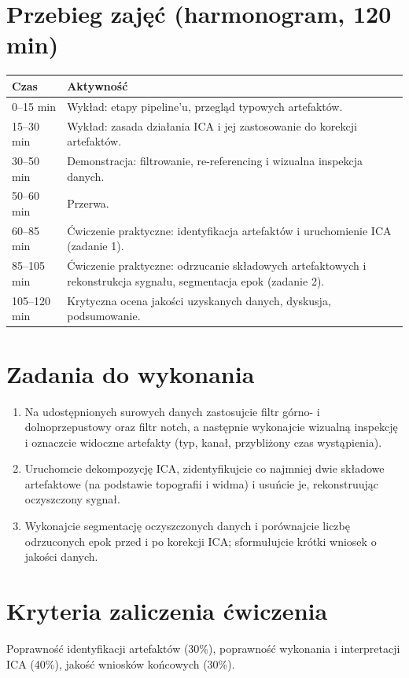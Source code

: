 \documentclass[11pt,a4paper]{article}
\begin{document}
\section{Przebieg zajęć (harmonogram, 120 min)}
\begin{center}
\begin{tabular}{@{}p{2.3cm}p{11.7cm}@{}}
\toprule
\textbf{Czas} & \textbf{Aktywność}\\
\midrule
0--15 min & Wykład: etapy pipeline'u, przegląd typowych artefaktów.\\
15--30 min & Wykład: zasada działania ICA i jej zastosowanie do korekcji artefaktów.\\
30--50 min & Demonstracja: filtrowanie, re-referencing i wizualna inspekcja danych.\\
50--60 min & Przerwa.\\
60--85 min & Ćwiczenie praktyczne: identyfikacja artefaktów i uruchomienie ICA (zadanie 1).\\
85--105 min & Ćwiczenie praktyczne: odrzucanie składowych artefaktowych i rekonstrukcja sygnału, segmentacja epok (zadanie 2).\\
105--120 min & Krytyczna ocena jakości uzyskanych danych, dyskusja, podsumowanie.\\
\bottomrule
\end{tabular}
\end{center}

\section{Zadania do wykonania}
\begin{enumerate}[label=\textbf{Zadanie \arabic*.}, leftmargin=2.7cm]
  \item Na udostępnionych surowych danych zastosujcie filtr górno- i dolnoprzepustowy oraz filtr notch, a następnie wykonajcie wizualną inspekcję i oznaczcie widoczne artefakty (typ, kanał, przybliżony czas wystąpienia).
  \item Uruchomcie dekompozycję ICA, zidentyfikujcie co najmniej dwie składowe artefaktowe (na podstawie topografii i widma) i usuńcie je, rekonstruując oczyszczony sygnał.
  \item Wykonajcie segmentację oczyszczonych danych i porównajcie liczbę odrzuconych epok przed i po korekcji ICA; sformułujcie krótki wniosek o jakości danych.
\end{enumerate}

\section{Kryteria zaliczenia ćwiczenia}
Poprawność identyfikacji artefaktów (30\%), poprawność wykonania i interpretacji ICA (40\%), jakość wniosków końcowych (30\%).
\end{document}

